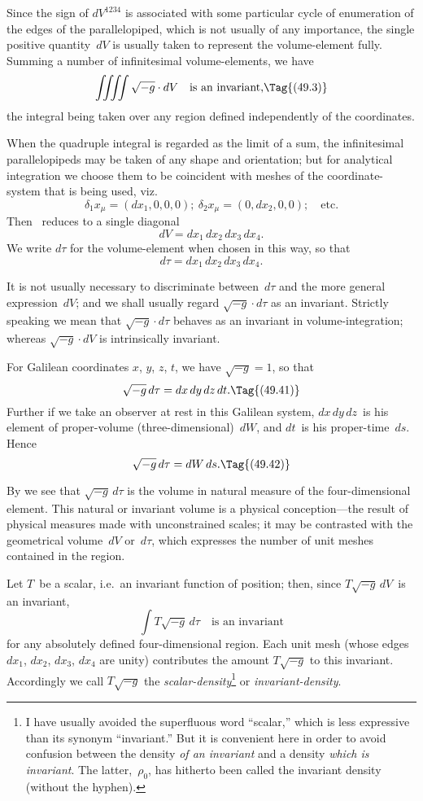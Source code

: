 \documentclass[12pt]{book}
\begin{document}
Since the sign of $dV^{1234}$ is associated with some particular cycle of
enumeration of the edges of the parallelopiped, which is not usually of any
importance, the single positive quantity~$dV$ is usually taken to represent the
volume-element fully. Summing a number of infinitesimal volume-elements,
%
we have
\[
\iiiint \sqrt{-g} \cdot dV\quad\text{is an invariant,}
\Tag{(49.3)}
\]
the integral being taken over any region defined independently of the
coordinates.

When the quadruple integral is regarded as the limit of a sum, the infinitesimal
parallelopipeds may be taken of any shape and orientation; but for
analytical integration we choose them to be coincident with meshes of the
coordinate-system that is being used, viz.\
\[
\delta_{1} x_{\mu} = (dx_{1}, 0, 0, 0);\
\delta_{2} x_{\mu} = (0, dx_{2} , 0, 0);\quad\text{etc.}
\]
Then ~reduces to a single diagonal
\[
dV = dx_{1}\, dx_{2}\, dx_{3}\, dx_{4}.
\]
We write $d\tau$ for the volume-element when chosen in this way, so that
\[
d\tau = dx_{1}\, dx_{2}\, dx_{3}\, dx_{4}.
\]

It is not usually necessary to discriminate between~$d\tau$ and the more
general expression~$dV$; and we shall usually regard $\sqrt{-g} \cdot d\tau$ as an invariant.
Strictly speaking we mean that $\sqrt{-g} \cdot d\tau$ behaves as an invariant in volume-integration;
whereas $\sqrt{-g} \cdot dV$ is intrinsically invariant.

For Galilean coordinates $x$, $y$, $z$, $t$, we have $\sqrt{-g} = 1$, so that
\[
\sqrt{-g}\, d\tau = dx\, dy\, dz\, dt.
\Tag{(49.41)}
\]
Further if we take an observer at rest in this Galilean system, $dx\, dy\,dz$~is his
element of proper-volume (three-dimensional)~$dW$, and $dt$~is his proper-time~$ds$.
\index{Proper-volume}%
Hence
\[
\sqrt{-g}\, d\tau = dW\, ds.
\Tag{(49.42)}
\]

By  we see that $\sqrt{-g}\, d\tau$ is the volume in natural measure of the
four-dimensional element. This natural or invariant volume is a physical
conception---the result of physical measures made with unconstrained scales;
it may be contrasted with the geometrical volume~$dV$ or~$d\tau$, which expresses
the number of unit meshes contained in the region.

Let $T$~be a scalar, i.e.\ an invariant function of position; then, since
$T\sqrt{-g}\, dV$~is an invariant,
\[
\int T\sqrt{-g}\, d\tau\quad\text{is an invariant}
\]
for any absolutely defined four-dimensional region. Each unit mesh (whose
edges $dx_{1}$, $dx_{2}$, $dx_{3}$, $dx_{4}$ are unity) contributes the amount $T\sqrt{-g}$ to this
invariant. Accordingly we call $T\sqrt{-g}$ the \emph{scalar-density}\footnote
  {I have usually avoided the superfluous word ``scalar,'' which is less expressive than its
  synonym ``invariant.'' But it is convenient here in order to avoid confusion between the density
  \emph{of an invariant} and a density \emph{which is invariant}. The latter,~$\rho_{0}$, has hitherto been called the
  invariant density (without the hyphen).}
or \emph{invariant-density}.
\index{Density!scalar-and tensor-}%
\index{Scalar-density}%
%
\end{document}
